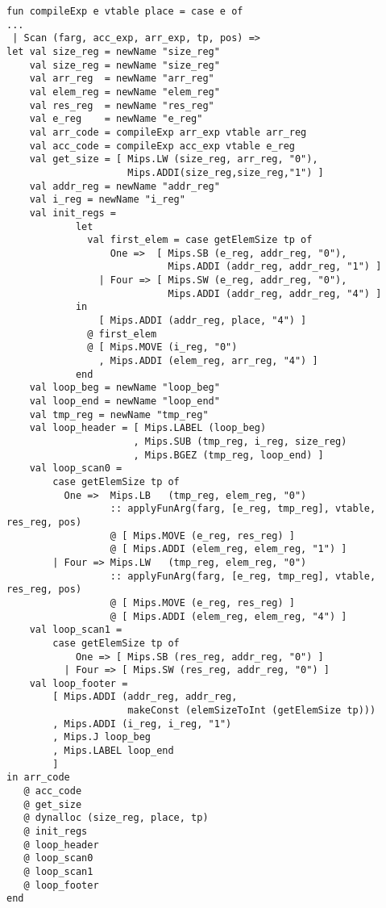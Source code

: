 \documentclass{article}
\begin{document}
\begin{lstlisting}
fun compileExp e vtable place = case e of
...
 | Scan (farg, acc_exp, arr_exp, tp, pos) =>
let val size_reg = newName "size_reg" 
    val size_reg = newName "size_reg" 
    val arr_reg  = newName "arr_reg"
    val elem_reg = newName "elem_reg" 
    val res_reg  = newName "res_reg"
    val e_reg    = newName "e_reg"
    val arr_code = compileExp arr_exp vtable arr_reg    
    val acc_code = compileExp acc_exp vtable e_reg
    val get_size = [ Mips.LW (size_reg, arr_reg, "0"),
                     Mips.ADDI(size_reg,size_reg,"1") ]
    val addr_reg = newName "addr_reg"
    val i_reg = newName "i_reg"
    val init_regs = 
    		let
              val first_elem = case getElemSize tp of
                  One =>  [ Mips.SB (e_reg, addr_reg, "0"), 
                            Mips.ADDI (addr_reg, addr_reg, "1") ]
                | Four => [ Mips.SW (e_reg, addr_reg, "0"),
                            Mips.ADDI (addr_reg, addr_reg, "4") ]
            in
                [ Mips.ADDI (addr_reg, place, "4") ]
              @ first_elem
              @ [ Mips.MOVE (i_reg, "0")
                , Mips.ADDI (elem_reg, arr_reg, "4") ]
            end
    val loop_beg = newName "loop_beg"
    val loop_end = newName "loop_end"
    val tmp_reg = newName "tmp_reg"
    val loop_header = [ Mips.LABEL (loop_beg)
                      , Mips.SUB (tmp_reg, i_reg, size_reg)
                      , Mips.BGEZ (tmp_reg, loop_end) ]
    val loop_scan0 =
        case getElemSize tp of
          One =>  Mips.LB   (tmp_reg, elem_reg, "0")
                  :: applyFunArg(farg, [e_reg, tmp_reg], vtable, res_reg, pos)
                  @ [ Mips.MOVE (e_reg, res_reg) ]
                  @ [ Mips.ADDI (elem_reg, elem_reg, "1") ]
        | Four => Mips.LW   (tmp_reg, elem_reg, "0")
                  :: applyFunArg(farg, [e_reg, tmp_reg], vtable, res_reg, pos)
                  @ [ Mips.MOVE (e_reg, res_reg) ]
                  @ [ Mips.ADDI (elem_reg, elem_reg, "4") ]
    val loop_scan1 =
        case getElemSize tp of
            One => [ Mips.SB (res_reg, addr_reg, "0") ]
          | Four => [ Mips.SW (res_reg, addr_reg, "0") ]
    val loop_footer =
        [ Mips.ADDI (addr_reg, addr_reg,
                     makeConst (elemSizeToInt (getElemSize tp)))
        , Mips.ADDI (i_reg, i_reg, "1")
        , Mips.J loop_beg
        , Mips.LABEL loop_end
        ]
in arr_code
   @ acc_code
   @ get_size
   @ dynalloc (size_reg, place, tp)
   @ init_regs
   @ loop_header
   @ loop_scan0
   @ loop_scan1
   @ loop_footer
end	
\end{lstlisting}
\end{document}
